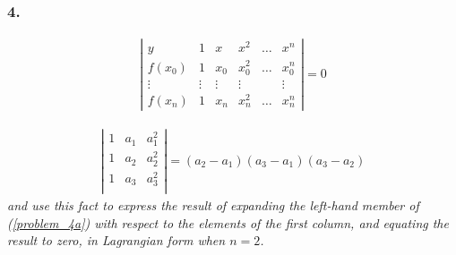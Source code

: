 \documentclass[12pt]{article}
\begin{document}
\subsubsection*{4.}

\begin{align}
\label{problem_4a}
\left|\begin{array}{cccccc}
y & 1 & x & x^2 & \dots & x^n \\
f(x_0) & 1 & x_0 & x_0^2 & \dots & x_0^n \\
\vdots & \vdots & \vdots & \vdots &  & \vdots \\
f(x_n) & 1 & x_n & x_n^2 & \dots & x_n^n
\end{array}\right| = 0
\end{align}

\begin{align*}
\left|\begin{array}{ccc}
1 & a_1 & a_1^2 \\
1 & a_2 & a_2^2 \\
1 & a_3 & a_3^2 \\
\end{array}\right| = (a_2 - a_1)(a_3 - a_1)(a_3 - a_2)
\end{align*}
{\it and use this fact to express the result of expanding the left-hand member of (\ref{problem_4a}) with respect to the elements of the first column, and equating the result to zero, in Lagrangian form when $n = 2$.} \\
\end{document}
